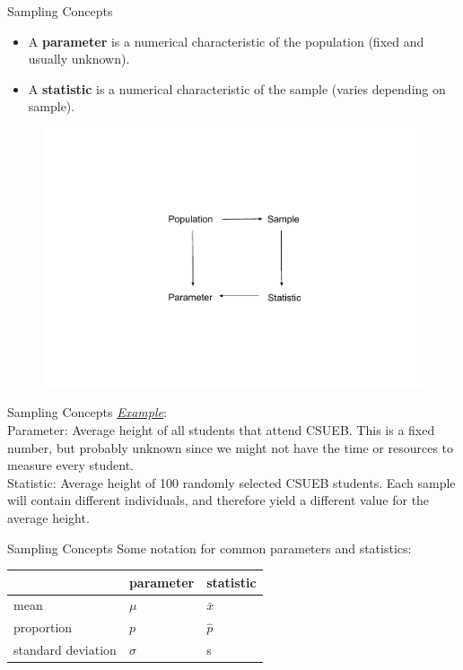 \documentclass[10pt]{beamer}
\begin{document}
\begin{frame}{Sampling Concepts}
\begin{itemize}
\item A \textbf{parameter} is a numerical characteristic of the population (fixed and usually unknown). 
\item A \textbf{statistic} is a numerical characteristic of the sample (varies depending on sample). \\
\end{itemize}
\begin{figure}
\includegraphics[scale=0.75]{figure/inference.pdf}
\end{figure}
\end{frame}

\begin{frame}{Sampling Concepts}
\emph{\underline{Example}}:\\ 
Parameter: Average height of all students that attend CSUEB.  This is a fixed number, but probably unknown since we might not have the time or resources to measure every student.\\
\vspace{10pt}
Statistic: Average height of 100 randomly selected CSUEB students.  Each sample will contain different individuals, and therefore yield a different value for the average height.\\
\end{frame}

\begin{frame}{Sampling Concepts}
Some notation for common parameters and statistics:\\
\vspace{10pt}

\begin{tabular}{|l|l|l|}
\hline
& parameter & statistic\\
\hline
mean & $\mu$ & $\bar{x}$\\
proportion & $p$ & $\hat{p}$\\
standard deviation & $\sigma$ & s\\
\hline
\end{tabular}
\end{frame}
\end{document}
